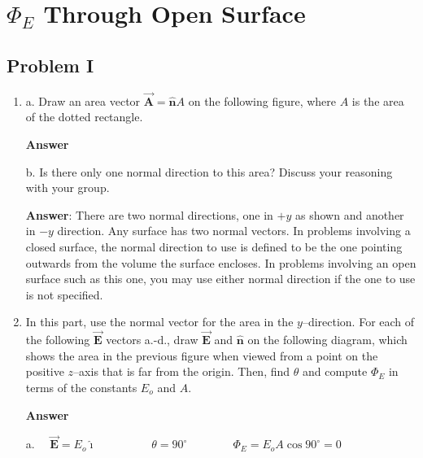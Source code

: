 \documentclass{article}
\newcommand{\ds}[0]{\displaystyle}
\newcommand{\ihat}[0]{\hat{\boldsymbol{\imath}}}
\newcommand{\jhat}[0]{\hat{\boldsymbol{\jmath}}}
\newcommand{\bfvec}[1]{\vec{\mathbf{#1}}}
\begin{document}
\newpage

\section{$\Phi_E$ Through Open Surface}

\subsection{Problem I}

\begin{enumerate}

  \item a. Draw an area vector $\bfvec{A}=\hat{\mathbf{n}}A$ on the following figure, where $A$ is the area of the dotted rectangle.

        \ifsolutions
        \textbf{Answer}

        
        \else

        
        \fi

        b. Is there only one normal direction to this area? Discuss your reasoning with your group.

        \ifsolutions
        \textbf{Answer}: There are two normal directions, one in $+y$ as shown and another in $-y$ direction. Any surface has two normal vectors. In problems involving a closed surface, the normal direction to use is defined to be the one pointing outwards from the volume the surface encloses. In problems involving an open surface such as this one, you may use either normal direction if the one to use is not specified.
        \else
        \vskip 72pt
        \fi

  \item In this part, use the normal vector for the area in the $y$--direction. For each of the following $\bfvec{E}$ vectors a.-d., draw $\bfvec{E}$ and $\hat{\mathbf{n}}$ on the following diagram, which shows the area in the previous figure when viewed from a point on the positive $z$--axis that is far from the origin. Then, find $\theta$ and compute $\Phi_E$ in terms of the constants $E_o$ and $A$.

        \ifsolutions
        \textbf{Answer}

        

        a. $\quad\ds\bfvec{E}=E_o\ihat\qquad\phantom{+\frac{E_o}{\sqrt{2}}\jhat}\theta=90^\circ\qquad\qquad\Phi_E=E_oA\cos 90^\circ = 0$


\end{enumerate}
\end{document}
